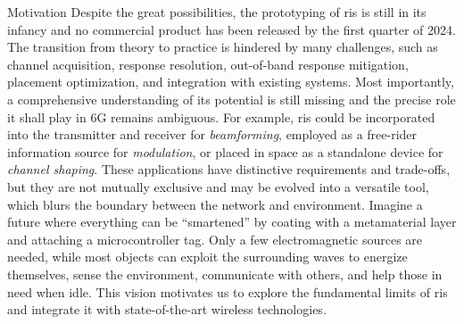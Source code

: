 \begin{section}{Motivation}
	Despite the great possibilities, the prototyping of \gls{ris} is still in its infancy and no commercial product has been released by the first quarter of 2024.
	The transition from theory to practice is hindered by many challenges, such as channel acquisition, response resolution, out-of-band response mitigation, placement optimization, and integration with existing systems.
	Most importantly, a comprehensive understanding of its potential is still missing and the precise role it shall play in 6G remains ambiguous.
	For example, \gls{ris} could be incorporated into the transmitter and receiver for \emph{beamforming}, employed as a free-rider information source for \emph{modulation}, or placed in space as a standalone device for \emph{channel shaping}.
	These applications have distinctive requirements and trade-offs, but they are not mutually exclusive and may be evolved into a versatile tool, which blurs the boundary between the network and environment.
	Imagine a future where everything can be ``smartened'' by coating with a metamaterial layer and attaching a microcontroller tag.
	Only a few electromagnetic sources are needed, while most objects can exploit the surrounding waves to energize themselves, sense the environment, communicate with others, and help those in need when idle.
	This vision motivates us to explore the fundamental limits of \gls{ris} and integrate it with state-of-the-art wireless technologies.
\end{section}

